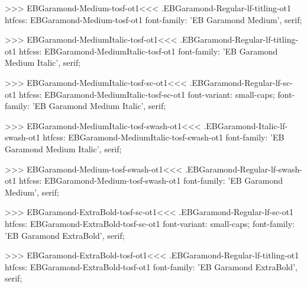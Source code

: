 {{{{{{{>>>
\<EBGaramond-Medium-tosf-ot1\><<<
.EBGaramond-Regular-lf-titling-ot1
htfcss:  EBGaramond-Medium-tosf-ot1  font-family: 'EB Garamond Medium', serif;

>>>
\<EBGaramond-MediumItalic-tosf-ot1\><<<
.EBGaramond-Regular-lf-titling-ot1
htfcss:  EBGaramond-MediumItalic-tosf-ot1  font-family: 'EB Garamond Medium Italic', serif;

>>>
\<EBGaramond-MediumItalic-tosf-sc-ot1\><<<
.EBGaramond-Regular-lf-sc-ot1
htfcss:  EBGaramond-MediumItalic-tosf-sc-ot1  font-variant: small-caps; font-family: 'EB Garamond Medium Italic', serif;

>>>
\<EBGaramond-MediumItalic-tosf-swash-ot1\><<<
.EBGaramond-Italic-lf-swash-ot1
htfcss:  EBGaramond-MediumItalic-tosf-swash-ot1  font-family: 'EB Garamond Medium Italic', serif;

>>>
\<EBGaramond-Medium-tosf-swash-ot1\><<<
.EBGaramond-Regular-lf-swash-ot1
htfcss:  EBGaramond-Medium-tosf-swash-ot1  font-family: 'EB Garamond Medium', serif;

>>>
\<EBGaramond-ExtraBold-tosf-sc-ot1\><<<
.EBGaramond-Regular-lf-sc-ot1
htfcss:  EBGaramond-ExtraBold-tosf-sc-ot1  font-variant: small-caps; font-family: 'EB Garamond ExtraBold', serif;

>>>
\<EBGaramond-ExtraBold-tosf-ot1\><<<
.EBGaramond-Regular-lf-titling-ot1
htfcss:  EBGaramond-ExtraBold-tosf-ot1  font-family: 'EB Garamond ExtraBold', serif;

}}}}}}}
